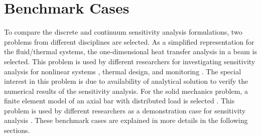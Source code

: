 \section{Benchmark Cases}
To compare the discrete and continuum sensitivity analysis formulations, two problems from different disciplines are selected. As a simplified representation for the fluid/thermal systems, the one-dimensional heat transfer analysis in a beam is selected. This problem is used by different researchers for investigating sensitivity analysis for nonlinear systems \cite{dowding2001sensitivity}, thermal design, and monitoring \cite{szopa2005second, sorli2004computational}. The special interest in this problem is due to availability of analytical solution to verify the numerical results of the sensitivity analysis. For the solid mechanics problem, a finite element model of an axial bar with distributed load is selected \cite{szabo1991finite}. This problem is used by different researchers as a demonstration case for sensitivity analysis \cite{cross2014local, wickert2009least}. These benchmark cases are explained in more details in the following sections.

